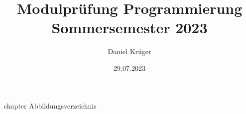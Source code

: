 \documentclass{scrreprt}
\title{Modulprüfung Programmierung Sommersemester 2023}
\author{Daniel Krüger \\ \matrikelnummer}
\date{29.07.2023}
\begin{document}
\nocite{*}

\maketitle

\tableofcontents

\listoffigures
{} {chapter} {Abbildungsverzeichnis}














\end{document}
